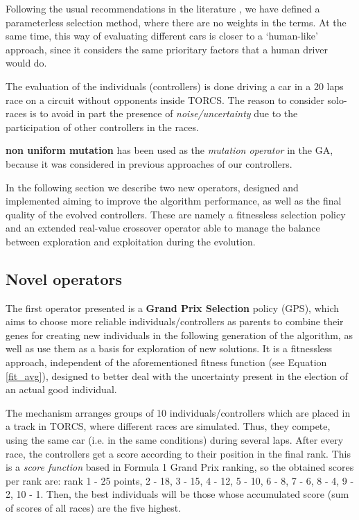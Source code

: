 \documentclass[10pt,journal,compsoc]{IEEEtran}
\begin{document}
Following the usual recommendations in the literature
\cite{Harik-ParameterLess99}, we have defined a parameterless
selection method, where there are no weights in the terms.
At the same time, this way of evaluating different cars is closer to a `human-like'
approach, since it considers the same prioritary factors that a human
driver would do. 

The evaluation of the individuals (controllers) is done driving a car
in a 20 laps race on a circuit without opponents inside TORCS. The
reason to consider solo-races is to avoid in part the presence of
\textit{noise/uncertainty} due to the participation of other
controllers \cite{merelo2016statistical} in the races. 

\textbf{non uniform mutation} \cite{mutation1997} has been used as the \textit{mutation operator} in the GA, because it was considered in previous approaches of our controllers. 

In the following section we describe two new operators, designed and implemented aiming to improve the algorithm performance, as well as the final quality of the evolved controllers. These are namely a fitnessless selection policy and an extended real-value crossover operator able to manage the balance between exploration and exploitation during the evolution.

\subsection{Novel operators}
\label{subsec:novel_operators}


The first operator presented is a \textbf{Grand Prix Selection} policy
(GPS), which aims to choose more reliable individuals/controllers as
parents to combine their genes for creating new individuals in the
following generation of the algorithm, as well as use them as a basis
for exploration of new solutions. It is a fitnessless approach,
independent of the aforementioned fitness function (see Equation
\ref{fit_avg}), designed to better deal with the uncertainty present
in the election of an actual good individual. 

The mechanism arranges groups of 10 individuals/controllers which are placed in a track in TORCS, where different races are simulated. Thus, they compete, using the same car (i.e. in the same conditions) during several laps. After every race, the controllers get a score according to their position in the final rank. This is a \textit{score function} based in Formula 1 Grand Prix ranking, so the obtained scores per rank are: rank 1 - 25 points, 2 - 18, 3 - 15, 4 - 12, 5 - 10, 6 - 8, 7 - 6, 8 - 4, 9 - 2, 10 - 1.
Then, the best individuals will be those whose accumulated score (sum of scores of all races) are the five highest.
\end{document}
